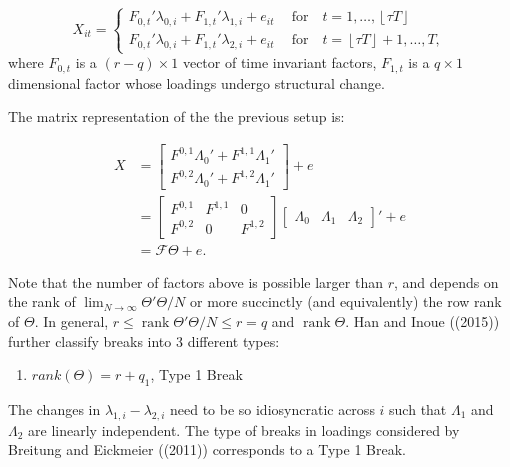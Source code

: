 \documentclass[
]{article}
\providecommand{\tightlist}{%
  \setlength{\itemsep}{0pt}\setlength{\parskip}{0pt}}
\begin{document}
\[
X_{it} = \begin{cases}
F_{0, t}' \lambda_{0, i} + F_{1, t}' \lambda_{1, i} + e_{it}\ \quad \text{for} \quad t = 1, \dots, \left \lfloor \tau T \right \rfloor  \\
F_{0, t}' \lambda_{0, i} + F_{1, t}' \lambda_{2, i} + e_{it}\ \quad \text{for} \quad t = \left \lfloor \tau T \right \rfloor  + 1, \dots, T,
\end{cases}
\] where \(F_{0, t}\) is a \((r - q) \times 1\) vector of time invariant
factors, \(F_{1, t}\) is a \(q \times 1\) dimensional factor whose
loadings undergo structural change.

The matrix representation of the the previous setup is:

\[
\begin{aligned}
X &= 
\begin{bmatrix}
F^{0, 1} \Lambda_0' + F^{1, 1} \Lambda_1' \\
F^{0, 2} \Lambda_0' + F^{1, 2} \Lambda_1'
\end{bmatrix} + e \\
&= \begin{bmatrix}
F^{0, 1} & F^{1, 1} & 0 \\
F^{0, 2} & 0 & F^{1, 2}
\end{bmatrix} 
\begin{bmatrix} \Lambda_0 & \Lambda_1 & \Lambda_2 \end{bmatrix}' + e \\
&= \mathcal{F} \Theta + e.
\end{aligned}
\]

Note that the number of factors above is possible larger than \(r\), and
depends on the rank of \(\lim_{N \to \infty} \Theta' \Theta/N\) or more
succinctly (and equivalently) the row rank of \(\Theta\). In general,
\(r \leq \operatorname{rank} \Theta' \Theta/N  \leq r = q\) and
\(\operatorname{rank} \Theta \). Han and Inoue ((2015)) further classify
breaks into 3 different types:

\begin{enumerate}
\def\labelenumi{\arabic{enumi}.}
\tightlist
\item
  \(rank(\Theta) = r + q_1\), Type 1 Break
\end{enumerate}

The changes in \(\lambda_{1, i} - \lambda_{2, i}\) need to be so
idiosyncratic across \(i\) such that \(\Lambda_1\) and \(\Lambda_2\) are
linearly independent. The type of breaks in loadings considered by
Breitung and Eickmeier ((2011)) corresponds to a Type 1 Break.
\end{document}
